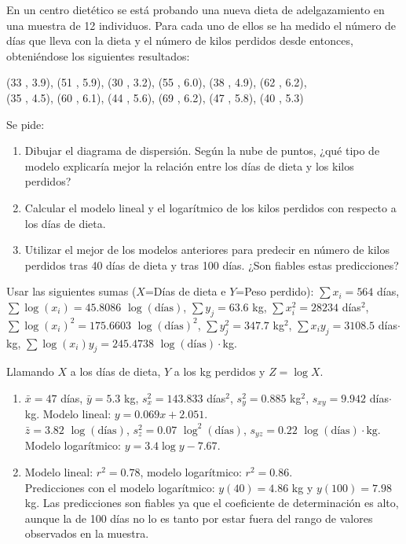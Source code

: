 {}


{En un centro dietético se está probando una nueva dieta de adelgazamiento en una muestra de 12 individuos. Para cada
uno de ellos se ha medido el número de días que lleva con la dieta y el número de kilos perdidos desde entonces,
obteniéndose los siguientes resultados:
\begin{center}
(33 , 3.9), (51 , 5.9), (30 , 3.2), (55 , 6.0), (38 , 4.9), (62 , 6.2),\\
(35 , 4.5), (60 , 6.1), (44 , 5.6), (69 , 6.2), (47 , 5.8), (40 , 5.3)
\end{center}
Se pide:
\begin{enumerate}
\item Dibujar el diagrama de dispersión. Según la nube de puntos, ¿qué tipo de modelo explicaría mejor la relación
entre los días de dieta y los kilos perdidos? 
\item Calcular el modelo lineal y el logarítmico de los kilos perdidos con respecto a los días de dieta.
\item Utilizar el mejor de los modelos anteriores para predecir en número de kilos perdidos tras 40 días de dieta y tras 100 días.
¿Son fiables estas predicciones?
\end{enumerate}
Usar las siguientes sumas ($X$=Días de dieta e $Y$=Peso perdido): $\sum x_i=564$ días, $\sum \log(x_i)=45.8086$
$\log(\mbox{días})$, $\sum y_j=63.6$ kg, $\sum x_i^2=28234$ días$^2$, $\sum \log(x_i)^2=175.6603$ $\log(\mbox{días})^2$, $\sum y_j^2=347.7$ kg$^2$, $\sum x_iy_j=3108.5$ días$\cdot$kg, $\sum \log(x_i)y_j=245.4738$ $\log(\mbox{días})\cdot$kg.
}
{Llamando $X$ a los días de dieta, $Y$ a los kg perdidos y $Z=\log X$.
\begin{enumerate}[start=2]
\item $\bar x=47$ días, $\bar y=5.3$ kg, $s_x^2=143.833$ días$^2$, $s_y^2=0.885$ kg$^2$, $s_{xy}=9.942$ días$\cdot$kg.
Modelo lineal: $y=0.069x+2.051$.\\ 
$\bar z=3.82$ $\log(\mbox{días})$, $s_z^2=0.07$ $\log^2(\mbox{días})$, $s_{yz}=0.22$ $\log(\mbox{días})\cdot\mbox{kg}$.\\
Modelo logarítmico: $y=3.4\log y-7.67$. 
\item Modelo lineal: $r^2=0.78$, modelo logarítmico: $r^2=0.86$.\\
Predicciones con el modelo logarítmico: $y(40)=4.86$ kg y $y(100)=7.98$ kg. 
Las predicciones son fiables ya que el coeficiente de determinación es alto, aunque la de 100 días no lo es tanto por estar fuera del rango de valores observados en la muestra. 
\end{enumerate}
}
{}


